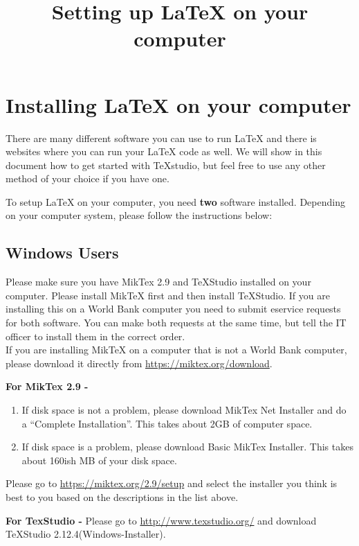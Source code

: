 \documentclass[]{article}
\title{Setting up {\LaTeX} on your computer}
\begin{document}
\maketitle
\section*{Installing {\LaTeX} on your computer}
There are many different software you can use to run {\LaTeX} and there is websites where you can run your {\LaTeX} code as well. We will show in this document how to get started with TeXstudio, but feel free to use any other method of your choice if you have one.

To setup {\LaTeX} on your computer, you need \textbf{two} software installed. Depending on your computer system, please follow the instructions below:

\subsection*{Windows Users}
Please make sure you have MikTex 2.9 and TeXStudio installed on your computer. Please install MikTeX first and then install TeXStudio. If you are installing this on a World Bank computer you need to submit eservice requests for both software. You can make both requests at the same time, but tell the IT officer to install them in the correct order. \\

If you are installing MikTeX on a computer that is not a World Bank computer, please download it directly from \url{https://miktex.org/download}.

\textbf{For MikTex 2.9 -}
\begin{enumerate}
\item If disk space is not a problem, please download MikTex Net Installer and do a ``Complete Installation''. This takes about 2GB of computer space.

\item If disk space is a problem, please download Basic MikTex Installer. This takes about 160ish MB of your disk space.
\end{enumerate}

Please go to \url{https://miktex.org/2.9/setup} and select the installer you think is best to you based on the descriptions in the list above.

\textbf{For TexStudio -  }
Please go to \url{http://www.texstudio.org/} and download TeXStudio 2.12.4(Windows-Installer).
\end{document}
